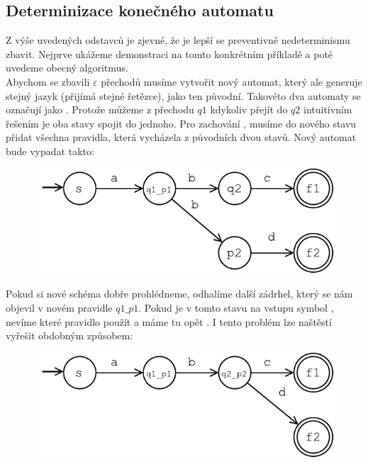 \subsection{Determinizace konečného automatu}

Z výše uvedených odstavců je zjevné, že je lepší se preventivně nedeterminismu
zbavit. Nejprve ukážeme demonstraci na tomto konkrétním příkladě a poté uvedeme
obecný algoritmus.\\

Abychom se zbavili $\varepsilon$ přechodů musíme vytvořit nový automat, který ale
generuje stejný jazyk (přijímá stejné řetězce),
jako ten původní. Takovéto dva automaty se označují jako .
Protože můžeme z přechodu $q1$ kdykoliv přejít do $q2$ intuitivním řešením
je oba stavy spojit do jednoho. Pro zachování , musíme
do nového stavu přidat všechna pravidla, která vycházela z původních dvou stavů.
Nový automat bude vypadat takto:

\begin{figure}[H]
  \centering
  \includegraphics{fig/finiteAutomat1_1.pdf}
\end{figure}

Pokud si nové schéma dobře prohlédneme, odhalíme další zádrhel, který se nám
objevil v novém pravidle $q1\_p1$. Pokud je v tomto stavu na vstupu symbol ,
nevíme které pravidlo použít a máme tu opět .
I tento problém lze naštěstí vyřešit obdobným způsobem:

\begin{figure}[H]
  \centering
  \includegraphics{fig/finiteAutomat1_2.pdf}
\end{figure}

